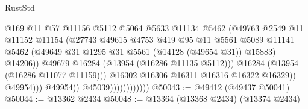 \begin{lexlean}{RustStd}
\begin{coremodule}
                                              @169
                                              @11
                                              @57
                                              @11156
                                              @5112
                                              @5064
                                              @5633
                                              @11134
                                              @5462
                                              (@49763
                                                @2549
                                                @11
                                                @11152
                                                @11154
                                                (@27743
                                                  @49615
                                                  @4753
                                                  @419
                                                  @95
                                                  @11
                                                  @5561
                                                  @5089
                                                  @11141
                                                  @5462
                                                  (@49649
                                                    @31
                                                    @1295
                                                    @31
                                                    @5561
                                                    (@14128 (@49654 @31))
                                                    @15883)
                                                  @14206))
                                              @49679
                                              @16284
                                              (@13954 (@16286 @11135 @5112)))
                                            @16284
                                            (@13954 (@16286 @11077 @11159)))
                                          @16302
                                          @16306
                                          @16311
                                          @16316
                                          @16322
                                          @16329))
                                      @49954)))
                                @49954))
                            @45039))))))))))))
@50043 := @49412 (@49437 @50041)
@50044 := @13362 @2434
@50048 := @13364 (@13368 @2434) (@13374 @2434)

\end{coremodule}
\end{lexlean}
